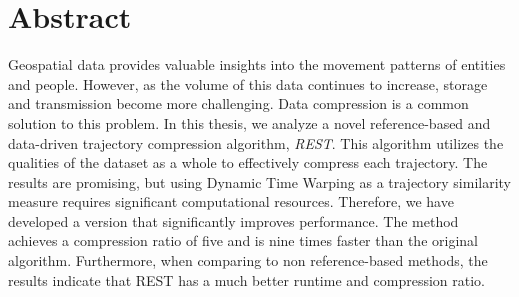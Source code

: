 \chapter*{Abstract}

Geospatial data provides valuable insights into the movement patterns of entities and people. However, as the volume of this data continues to increase, storage and transmission become more challenging. Data compression is a common solution to this problem. In this thesis, we analyze a novel reference-based and data-driven trajectory compression algorithm, \textit{REST}. This algorithm utilizes the qualities of the dataset as a whole to effectively compress each trajectory. The results are promising, but using Dynamic Time Warping as a trajectory similarity measure requires significant computational resources. Therefore, we have developed a version that significantly improves performance. The method achieves a compression ratio of five and is nine times faster than the original algorithm. Furthermore, when comparing to non reference-based methods, the results indicate that REST has a much better runtime and compression ratio.
